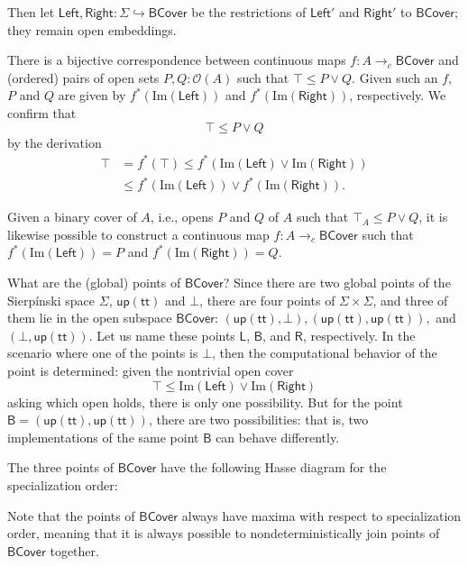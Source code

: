 \documentclass[conference]{IEEEtran}
\newcommand{\hookto}{\hookrightarrow}
\newcommand{\cto}{\to_c}
\newcommand{\Open}[1]{\mathcal{O}({#1})}
\newcommand{\Img}[1]{\text{Im}\left({#1}\right)}
\newcommand{\strue}{\mathsf{up}(\mathsf{tt})}
\newcommand{\sfalse}{\bot}
\newcommand{\BCover}{\mathsf{BCover}}
\newcommand{\iimg}[1]{{#1}^*}
\begin{document}
Then let $\mathsf{Left}, \mathsf{Right} : \Sigma \hookto \BCover$ be the restrictions of $\mathsf{Left}'$ and $\mathsf{Right}'$ to $\BCover$; they remain open embeddings.

There is a bijective correspondence between continuous maps $f : A \cto \BCover$ and (ordered) pairs of open sets $P, Q : \Open{A}$ such that $\top \le P \vee Q$. Given such an $f$, $P$ and $Q$ are given by $\iimg{f}(\Img{\mathsf{Left}})$ and $\iimg{f}(\Img{\mathsf{Right}})$, respectively. We confirm that
\[
\top \le P \vee Q
\]
by the derivation
\begin{align*}
\top &= \iimg{f}(\top) 
  \le \iimg{f}(\Img{\mathsf{Left}} \vee \Img{\mathsf{Right}})
 \\ &\le \iimg{f}(\Img{\mathsf{Left}}) \vee \iimg{f}(\Img{\mathsf{Right}}).
\end{align*}

Given a binary cover of $A$, i.e., opens $P$ and $Q$ of $A$ such that $\top_A \le P \vee Q$, it is likewise possible to construct a continuous map $f: A \cto \BCover$ such that $\iimg{f}(\Img{\mathsf{Left}}) = P$ and $\iimg{f}(\Img{\mathsf{Right}}) = Q$.

What are the (global) points of $\BCover$? Since there are two global points of the Sierp\'inski space $\Sigma$, $\strue$ and $\sfalse$, there are four points of $\Sigma \times \Sigma$, and three of them lie in the open subspace $\BCover$: $(\strue, \sfalse), (\strue, \strue),$ and $(\sfalse, \strue)$. Let us name these points $\mathsf{L}$, $\mathsf{B}$, and $\mathsf{R}$, respectively. In the scenario where one of the points is $\sfalse$, then the computational behavior of the point is determined: given the nontrivial open cover 
\[
\top \le \Img{\mathsf{Left}} \vee \Img{\mathsf{Right}}
\]
asking which open holds, there is only one possibility. But for the point $\mathsf{B} = (\strue, \strue)$, there are two possibilities: that is, two implementations of the same point $\mathsf{B}$ can behave differently.

The three points of $\BCover$ have the following Hasse diagram for the specialization order:
\begin{center}
\end{center}
Note that the points of $\BCover$ always have maxima with respect to specialization order, meaning that it is always possible to nondeterministically join points of $\BCover$ together.
\end{document}
